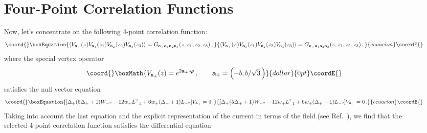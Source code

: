 \documentclass[a4paper,12pt]{article}
\providecommand{\bm}{\boldsymbol}
\begin{document}
\section{Four-Point Correlation Functions}
Now, let's concentrate on the following  4-point correlation function:
\begin{equation}\coord{}\boxEquation{	
\langle V_{{\bf a}_+}(z)V_{{\bf a}_1}(z_1)V_{{\bf a}_2}(z_2)
V_{{\bf a}_3}(z_3)\rangle
=G_{{\bf a}_+{\bf a}_1{\bf a}_2{\bf a}_3} (z,z_1,z_2,z_3)\, ,
\label{eq:14}
}{	
\langle V_{{\bf a}_+}(z)V_{{\bf a}_1}(z_1)V_{{\bf a}_2}(z_2)
V_{{\bf a}_3}(z_3)\rangle
=G_{{\bf a}_+{\bf a}_1{\bf a}_2{\bf a}_3} (z,z_1,z_2,z_3)\, ,
}{ecuacion}\coordE{}\end{equation}
where the special vertex operator
$$\coord{}\boxMath{
V_{{\bf a}_+}(z)=e^{2{\bf a}_+\cdot{\bm\varphi}}\,,\qquad
{\bf a}_+=\left(-b,b/\sqrt3\,\right)
}{dollar}{0pt}\coordE{}$$
satisfies the null vector equation
\begin{equation}\coord{}\boxEquation{	
[\Delta_+(5\Delta_++1)W_{-2}-12w_+L^2_{-1}+6w_+(\Delta_++1)L_{-2}]
V_{{\bf a}_+}=0\,.
\label{eq:16}
}{	
[\Delta_+(5\Delta_++1)W_{-2}-12w_+L^2_{-1}+6w_+(\Delta_++1)L_{-2}]
V_{{\bf a}_+}=0\,.
}{ecuacion}\coordE{}\end{equation}
Taking into account the last equation and the explicit representation
of the current \coordHE{} in terms of the field \myHighlight{$\partial{\bm\varphi}$}\coordHE{} 
(see Ref.~\cite{LF}), we find that the selected 4-point correlation
function satisfies the differential equation
\end{document}
